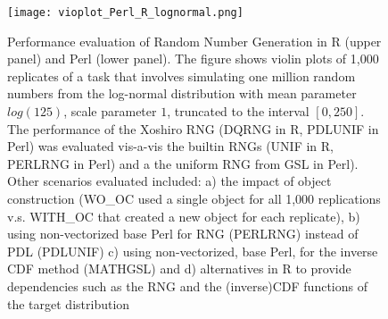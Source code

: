 \documentclass[10pt]{article}
\begin{document}
\newpage
\begin{figure}[H]
\centering  
\texttt{[image: vioplot\_Perl\_R\_lognormal.png]}
\caption{Performance evaluation of Random Number Generation in R (upper panel) and Perl (lower panel). The figure shows violin plots of 1,000 replicates of a task that involves simulating one million random numbers from the log-normal distribution with mean parameter $log(125)$, scale parameter $1$, truncated to the interval $[0,250]$. The performance of the Xoshiro RNG (DQRNG in R, PDLUNIF in Perl) was evaluated vis-a-vis the builtin RNGs (UNIF in R, PERLRNG in Perl) and a the uniform RNG from GSL in Perl). Other scenarios evaluated included: a) the impact of object construction (WO\_OC used a single object for all 1,000 replications v.s. WITH\_OC that created a new object for each replicate), b) using non-vectorized base Perl for RNG (PERLRNG) instead of PDL (PDLUNIF) c) using non-vectorized, base Perl, for the inverse CDF method (MATHGSL) and d) alternatives in R to provide dependencies such as the RNG and the (inverse)CDF functions of the target distribution }\label{fig:LognormalRNGTiming}
\end{figure}
\newpage
\end{document}
